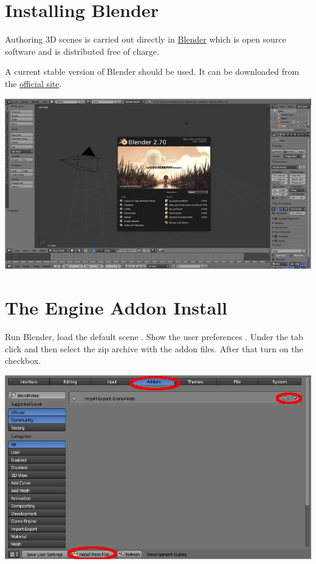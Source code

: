 \documentclass[a4paper,12pt,oneside]{sphinxmanual}
\begin{document}
\section{Installing Blender}
\label{first_steps:first-steps-blender}\label{first_steps:blender}
Authoring 3D scenes is carried out directly in \href{http://en.wikipedia.org/wiki/Blender\_(software)}{Blender} which is open source software and is distributed free of charge.

A current stable version of Blender should be used. It can be downloaded from the \href{http://www.blender.org/download}{official site}.

{\hfill\includegraphics[width=1.000\linewidth]{blender_first_run.jpg}\hfill}


\section{The Engine Addon Install}
\label{first_steps:index-0}\label{first_steps:id4}\label{first_steps:first-step-addon}
Run Blender, load the default scene . Show the user preferences . Under the  tab click  and then select the zip archive with the addon files. After that turn on the   checkbox.

{\hfill\includegraphics[width=1.000\linewidth]{user_preferences_install_b2w.jpg}\hfill}
\end{document}
